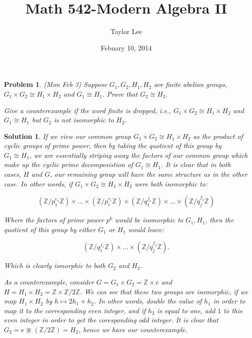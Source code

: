 \documentclass[12pt]{article}
\theoremstyle{moo}
\newtheorem*{prob}{Problem}
\newtheorem*{sol}{Solution}
\def\zz{{\mathbb Z}}
\begin{document}
\fontseries {\seriesdefault}
\fontshape {\shapedefault}
\selectfont

\title{ Math 542-Modern Algebra II}
\date{Febuary 10, 2014}         %
\author{Taylor Lee}      %
\maketitle                      %

\begin{prob}
(Mon Feb 3) Suppose $G_1,G_2,H_1,H_2$ are finite abelian groups,
$G_1 \times G_2 \cong H_1 \times H_2$ and $G_1\cong H_1$.
Prove that $G_2\cong H_2$.
\par Give a counterexample if the word finite is dropped, i.e.,
$G_1\times G_2\cong H_1\times H_2$ and $G_1\cong H_1$ but $G_2$
is not isomorphic to $H_2$.   
\end{prob}



\begin{sol}
If we view our common group $G_1 \times G_2 \cong H_1 \times H_2$ as the product of cyclic groups of prime power, then by taking the quotient of this group by $G_1\cong H_1$, we are essentially striping away the factors of our common group which make up the cyclic prime decomposistion of $G_1\cong H_1$. It is clear that in both cases, $H$ and $G$, our remaining group will have the same structure as in the other case. In other words, if $G_1 \times G_2 \cong H_1 \times H_2$ were both isomorphic to:

\[
( \zz/p_1^{e_1} \zz ) \times \dots \times ( \zz / p_i^{e_i} \zz ) \times (\zz/ q_1^{f_1} \zz) \times \dots \times (\zz / q_j^{f_j} \zz)
\]

Where the factors of prime power $p^k$ would be isomorphic to $G_1, H_1$, then the quotient of this group by either $G_1$ or  $H_1$ would leave:

\[
(\zz/q_1^{f_1} \zz) \times \dots \times (\zz / q_j^{f_j} \zz).
\]

Which is clearly ismorphic to both $G_2$ and $H_2$.

As a counterexample, consider $G = G_1 \times G_2 = \zz \times {e}$ and $H = H_1 \times H_2 = \zz \times \zz/2\zz$. We can see that these two groups are isomorphic, if we map $H_1 \times H_2 $ by $h \mapsto 2h_1 + h_2$. In other words, double the value of $h_1$ in order to map it to the corresponding even integer, and if $h_2$ is equal to one, add $1$ to this even integer in order to get the coresponding odd integer. It is clear that $G_2 = {e} \ncong (\zz/2\zz) = H_2$, hence we have our counterexample. 
\end{sol}
\end{document}

